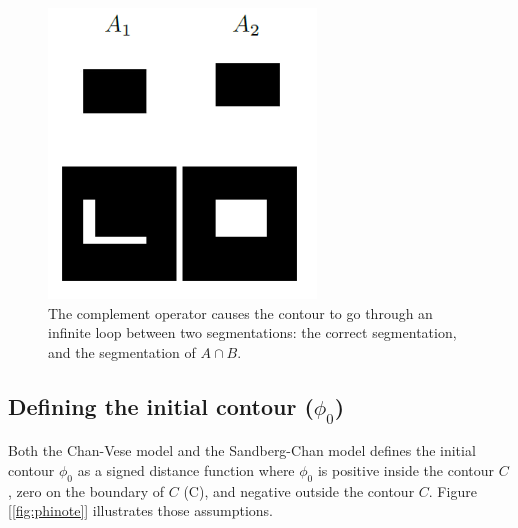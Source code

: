 \documentclass[10pt,twocolumn,letterpaper]{article}
\begin{document}
\begin{figure}[t]
\centering
\includegraphics[width=\textwidth]{sccomp.png}
\caption{The complement operator causes the contour to go through an infinite loop between two segmentations: the correct segmentation, and the segmentation
of $A \cap B$.}
\label{fig:sccomp}
\end{figure}

\subsection{Defining the initial contour ($\phi_0$)}
Both the Chan-Vese model and the Sandberg-Chan model defines the initial contour $\phi_0$ as a signed distance function where $\phi_0$ is positive inside the
contour $C$, zero on the boundary of $C$ (\partial C), and negative outside the contour $C$. Figure [\ref{fig:phinote}] illustrates those assumptions.
\end{document}
